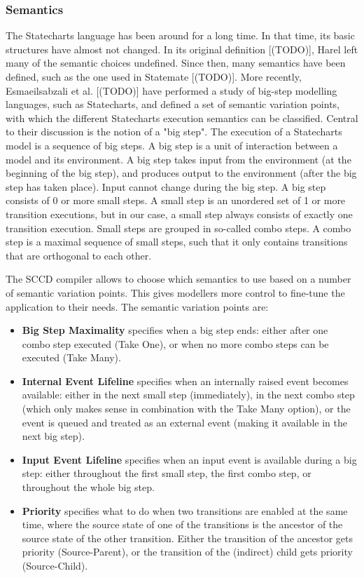 \subsubsection{Semantics}
The Statecharts language has been around for a long time. In that time, its basic structures have almost not changed. In its 
original definition [(TODO)], Harel left many of the semantic choices undefined. Since then, many semantics have been defined, 
such as the one used in Statemate [(TODO)]. More recently, Esmaeilsabzali et al. [(TODO)] have performed a study of big-step 
modelling languages, such as Statecharts, and defined a set of semantic variation points, with which the different Statecharts 
execution semantics can be classified. Central to their discussion is the notion of a "big step". The execution of a Statecharts 
model is a sequence of big steps. A big step is a unit of interaction between a model and its environment. A big step takes input 
from the environment (at the beginning of the big step), and produces output to the environment (after the big step has taken 
place). Input cannot change during the big step. A big step consists of 0 or more small steps. A small step is an unordered set 
of 1 or more transition executions, but in our case, a small step always consists of exactly one transition execution. Small steps 
are grouped in so-called combo steps. A combo step is a maximal sequence of small steps, such that it only contains transitions 
that are orthogonal to each other.

The SCCD compiler allows to choose which semantics to use based on a number of semantic variation points. This gives modellers 
more control to fine-tune the application to their needs. The semantic variation points are:
\begin{itemize}
    \item \textbf{Big Step Maximality} specifies when a big step ends: either after one combo step executed (Take One), or when 
    no more combo steps can be executed (Take Many).
    \item \textbf{Internal Event Lifeline} specifies when an internally raised event becomes available: either in the next small 
    step (immediately), in the next combo step (which only makes sense in combination with the Take Many option), or the event is 
    queued and treated as an external event (making it available in the next big step).
    \item \textbf{Input Event Lifeline} specifies when an input event is available during a big step: either throughout the first 
    small step, the first combo step, or throughout the whole big step.
    \item \textbf{Priority} specifies what to do when two transitions are enabled at the same time, where the source state of one 
    of the transitions is the ancestor of the source state of the other transition. Either the transition of the ancestor gets 
    priority (Source-Parent), or the transition of the (indirect) child gets priority (Source-Child).
\end{itemize}


